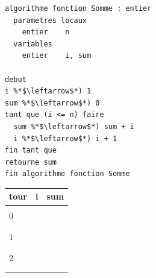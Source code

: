 \documentclass[11pt,a4paper]{article}
\begin{document}
\begin{table}[!ht]
  \centering
  \begin{minipage}{0.59\textwidth}
    \centering
\begin{lstlisting}[style=algorithmique]
algorithme fonction Somme : entier
  parametres locaux
    entier    n
  variables
    entier    i, sum

debut
i %*$\leftarrow$*) 1
sum %*$\leftarrow$*) 0
tant que (i <= n) faire
  sum %*$\leftarrow$*) sum + i
  i %*$\leftarrow$*) i + 1
fin tant que
retourne sum
fin algorithme fonction Somme \end{lstlisting}
  \end{minipage}
  \hfillx
  \begin{minipage}{0.4\textwidth}
    \centering
    \begin{tabular}{|C{1cm}|C{1cm}|C{1cm}|}
        \hline
        tour &  i &  sum  \\
        \hline
             &    &       \\
        0    &    &       \\
             &    &       \\
        \hline
             &    &       \\
        1    &    &       \\
             &    &       \\
        \hline
             &    &       \\
        2    &    &       \\
             &    &       \\
        \hline
             &    &       \\

\end{tabular}
\end{minipage}
\end{table}
\end{document}
